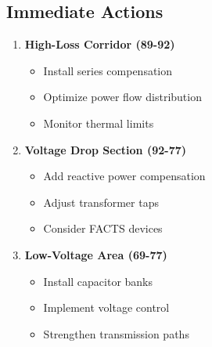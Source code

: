\documentclass[11pt]{article}
\begin{document}
\subsection{Immediate Actions}
\begin{enumerate}
    \item \textbf{High-Loss Corridor (89-92)}
    \begin{itemize}
        \item Install series compensation
        \item Optimize power flow distribution
        \item Monitor thermal limits
    \end{itemize}
    
    \item \textbf{Voltage Drop Section (92-77)}
    \begin{itemize}
        \item Add reactive power compensation
        \item Adjust transformer taps
        \item Consider FACTS devices
    \end{itemize}
    
    \item \textbf{Low-Voltage Area (69-77)}
    \begin{itemize}
        \item Install capacitor banks
        \item Implement voltage control
        \item Strengthen transmission paths
    \end{itemize}
\end{enumerate}
\end{document}
